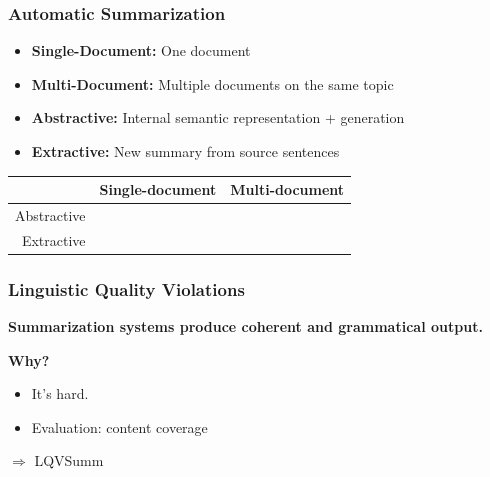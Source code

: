 \documentclass[table]{beamer}
\begin{document}
\begin{frame}
  \frametitle{Automatic Summarization}
  \begin{itemize}
    \item \textbf{Single-Document:} One document
    \item \textbf{Multi-Document:} Multiple documents on the same topic
  \end{itemize}
  \pause
  \begin{itemize}
    \item \textbf{Abstractive:} Internal semantic representation + generation
    \item \textbf{Extractive:} New summary from source sentences
  \end{itemize}
  \pause
  \vspace{1cm}

  \quad \quad \quad \begin{tabular}{r|c|c|}
    & Single-document & Multi-document\\
    \hline
    Abstractive & \cellcolor{red!25} & \cellcolor{red!25}\\
    \hline
    Extractive & \cellcolor{red!25} & \cellcolor{green!25}\\
    \hline
  \end{tabular}
\end{frame}

\begin{frame}
  \frametitle{Linguistic Quality Violations}
  \textbf{Summarization systems  produce coherent and grammatical output.}
  \pause

  \textbf{Why?}
  \begin{itemize}
    \item It's hard.\pause
    \item Evaluation: content coverage
  \end{itemize}
  \vspace{1cm}
  \pause
  $\Rightarrow$ LQVSumm \citep{friedrichlqvsumm}


\end{frame}
\end{document}
